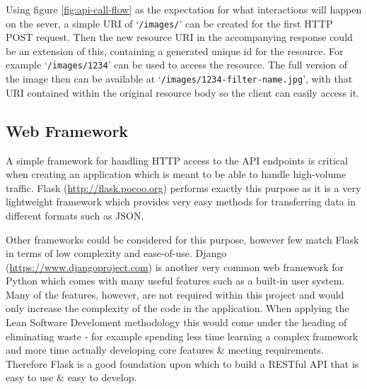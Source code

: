 \documentclass[a4paper,12pt]{report}
\begin{document}
        Using figure \ref{fig:api-call-flow} as the expectation for what interactions will happen on the sever, a simple URI of ‘\texttt{/images/}’ can be created for the first HTTP POST request. Then the new resource URI in the accompanying response could be an extension of this, containing a generated unique id for the resource. For example ‘\texttt{/images/1234}’ can be used to access the resource. The full version of the image then can be available at ‘\texttt{/images/1234-filter-name.jpg}’, with that URI contained within the original resource body so the client can easily access it.

    \subsection{Web Framework}
      A simple framework for handling HTTP access to the API endpoints is critical when creating an application which is meant to be able to handle high-volume traffic. Flask (\url{http://flask.pocoo.org}) performs exactly this purpose as it is a very lightweight framework which provides very easy methods for transferring data in different formats such as JSON.

      Other frameworks could be considered for this purpose, however few match Flask in terms of low complexity and ease-of-use. Django (\url{https://www.djangoproject.com}) is another very common web framework for Python which comes with many useful features such as a built-in user system. Many of the features, however, are not required within this project and would only increase the complexity of the code in the application. When applying the Lean Software Develoment methodology \citep{poppendieck2003lean} this would come under the heading of eliminating waste - for example spending less time learning a complex framework and more time actually developing core features \& meeting requirements. Therefore Flask is a good foundation upon which to build a RESTful API that is easy to use \& easy to develop.
\end{document}
